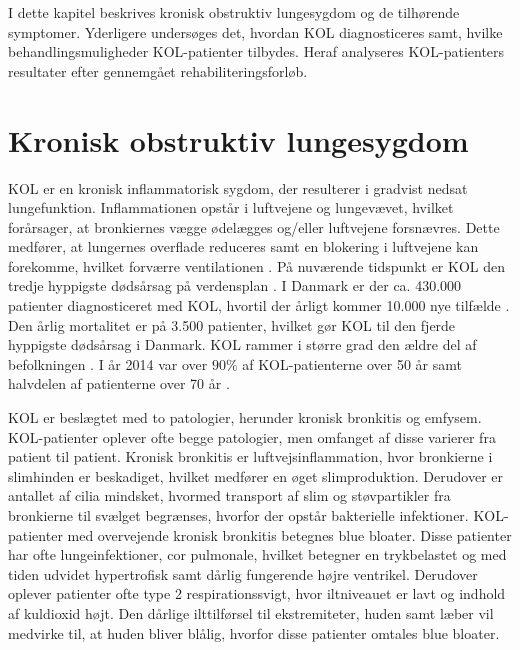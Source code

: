 I dette kapitel beskrives kronisk obstruktiv lungesygdom og de tilhørende symptomer. Yderligere undersøges det, hvordan KOL diagnosticeres samt, hvilke behandlingsmuligheder KOL-patienter tilbydes. Heraf analyseres KOL-patienters resultater efter gennemgået rehabiliteringsforløb.

\section{Kronisk obstruktiv lungesygdom}
KOL er en kronisk inflammatorisk sygdom, der resulterer i gradvist nedsat lungefunktion. Inflammationen opstår i luftvejene og lungevævet, hvilket forårsager, at bronkiernes vægge ødelægges og/eller luftvejene forsnævres. Dette medfører, at lungernes overflade reduceres samt en blokering i luftvejene kan forekomme, hvilket forværre ventilationen \cite{Lungeforeningen2016}. På nuværende tidspunkt er KOL den tredje hyppigste dødsårsag på verdensplan \cite{WHO2017}. I Danmark er der ca. 430.000 patienter diagnosticeret med KOL, hvortil der årligt kommer 10.000 nye tilfælde \cite{Sygdomsbyrden2015}. Den årlig mortalitet er på 3.500 patienter, hvilket gør KOL til den fjerde hyppigste dødsårsag i Danmark. \cite{Basisbogen2016} KOL rammer i større grad den ældre del af befolkningen \cite{Kontaktforbrug2016}. I år 2014 var over $90\%$ af KOL-patienterne over 50 år samt halvdelen af patienterne over 70 år \cite{Kontaktforbrug2016}.

KOL er beslægtet med to patologier, herunder kronisk bronkitis og emfysem. KOL-patienter oplever ofte begge patologier, men omfanget af disse varierer fra patient til patient.\cite{Basisbogen2016}
Kronisk bronkitis er luftvejsinflammation, hvor bronkierne i slimhinden er beskadiget, hvilket medfører en øget slimproduktion. Derudover er antallet af cilia mindsket, hvormed transport af slim og støvpartikler fra bronkierne til svælget begrænses, hvorfor der opstår bakterielle infektioner.\cite{Frausing2011,Britannica2016} KOL-patienter med overvejende kronisk bronkitis betegnes blue bloater. Disse patienter har ofte lungeinfektioner, cor pulmonale, hvilket betegner en trykbelastet og med tiden udvidet hypertrofisk samt dårlig fungerende højre ventrikel. Derudover oplever patienter ofte  type 2 respirationssvigt, hvor iltniveauet er lavt og indhold af kuldioxid højt. Den dårlige ilttilførsel til ekstremiteter, huden samt læber vil medvirke til, at huden bliver blålig, hvorfor disse patienter omtales blue bloater.\cite{Healthguidances2016}

